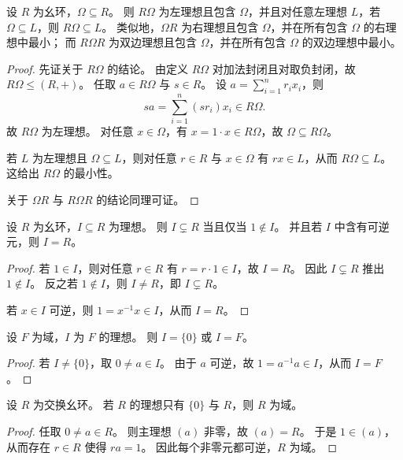 \documentclass[lang=cn,a4paper,newtx]{elegantbook}
\begin{document}
\begin{proposition}
设 $R$ 为幺环，$\Omega\subseteq R$。
则 $R\Omega$ 为左理想且包含 $\Omega$，并且对任意左理想 $L$，若 $\Omega\subseteq L$，则 $R\Omega\subseteq L$。
类似地，$\Omega R$ 为右理想且包含 $\Omega$，并在所有包含 $\Omega$ 的右理想中最小；
而 $R\Omega R$ 为双边理想且包含 $\Omega$，并在所有包含 $\Omega$ 的双边理想中最小。
\end{proposition}

\begin{proof}
先证关于 $R\Omega$ 的结论。
由定义 $R\Omega$ 对加法封闭且对取负封闭，故 $R\Omega\le (R,+)$。
任取 $a\in R\Omega$ 与 $s\in R$。
设 $a=\sum_{i=1}^n r_ix_i$，则
\[
  sa=\sum_{i=1}^n (sr_i)x_i\in R\Omega.
\]
故 $R\Omega$ 为左理想。
对任意 $x\in \Omega$，有 $x=1\cdot x\in R\Omega$，故 $\Omega\subseteq R\Omega$。

若 $L$ 为左理想且 $\Omega\subseteq L$，则对任意 $r\in R$ 与 $x\in \Omega$ 有 $rx\in L$，从而 $R\Omega\subseteq L$。
这给出 $R\Omega$ 的最小性。

关于 $\Omega R$ 与 $R\Omega R$ 的结论同理可证。
\end{proof}

\begin{proposition}
设 $R$ 为幺环，$I\subseteq R$ 为理想。
则 $I\subsetneq R$ 当且仅当 $1\notin I$。
并且若 $I$ 中含有可逆元，则 $I=R$。
\end{proposition}

\begin{proof}
若 $1\in I$，则对任意 $r\in R$ 有 $r=r\cdot 1\in I$，故 $I=R$。
因此 $I\subsetneq R$ 推出 $1\notin I$。
反之若 $1\notin I$，则 $I\ne R$，即 $I\subsetneq R$。

若 $x\in I$ 可逆，则 $1=x^{-1}x\in I$，从而 $I=R$。
\end{proof}

\begin{proposition}
设 $F$ 为域，$I$ 为 $F$ 的理想。
则 $I=\{0\}$ 或 $I=F$。
\end{proposition}

\begin{proof}
若 $I\ne\{0\}$，取 $0\ne a\in I$。
由于 $a$ 可逆，故 $1=a^{-1}a\in I$，从而 $I=F$。
\end{proof}

\begin{proposition}
设 $R$ 为交换幺环。
若 $R$ 的理想只有 $\{0\}$ 与 $R$，则 $R$ 为域。
\end{proposition}

\begin{proof}
任取 $0\ne a\in R$。
则主理想 $(a)$ 非零，故 $(a)=R$。
于是 $1\in (a)$，从而存在 $r\in R$ 使得 $ra=1$。
因此每个非零元都可逆，$R$ 为域。
\end{proof}
\end{document}
